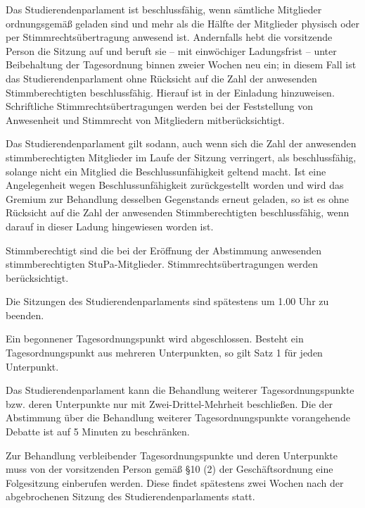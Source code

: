 \documentclass[10pt,a4paper]{scrartcl}
\begin{document}
\begin{contract}
  Das Studierendenparlament ist beschlussfähig, wenn sämtliche Mitglieder
  ordnungsgemäß geladen sind und mehr als die Hälfte der Mitglieder
  physisch oder per Stimmrechtsübertragung anwesend ist. Andernfalls
  hebt die vorsitzende Person die Sitzung auf und beruft sie -- mit
  einwöchiger Ladungsfrist -- unter Beibehaltung der Tagesordnung binnen
  zweier Wochen neu ein; in diesem Fall ist das Studierendenparlament
  ohne Rücksicht auf die Zahl der anwesenden Stimmberechtigten
  beschlussfähig. Hierauf ist in der Einladung hinzuweisen. Schriftliche
  Stimmrechtsübertragungen werden bei der Feststellung von Anwesenheit
  und Stimmrecht von Mitgliedern mitberücksichtigt.

  Das Studierendenparlament gilt sodann, auch wenn sich die Zahl der
  anwesenden stimmberechtigten Mitglieder im Laufe der Sitzung
  verringert, als beschlussfähig, solange nicht ein Mitglied die
  Beschlussunfähigkeit geltend macht. Ist eine Angelegenheit wegen
  Beschlussunfähigkeit zurückgestellt worden und wird das Gremium zur
  Behandlung desselben Gegenstands erneut geladen, so ist es ohne
  Rücksicht auf die Zahl der anwesenden Stimmberechtigten
  beschlussfähig, wenn darauf in dieser Ladung hingewiesen worden ist.

  Stimmberechtigt sind die bei der Eröffnung der Abstimmung anwesenden
  stimmberechtigten StuPa-Mitglieder. Stimmrechtsübertragungen werden
  berücksichtigt.



\label{dauer-der-sitzungen}




  Die Sitzungen des Studierendenparlaments sind spätestens um 1.00 Uhr
  zu beenden.

  Ein begonnener Tagesordnungspunkt wird abgeschlossen. Besteht ein
  Tagesordnungspunkt aus mehreren Unterpunkten, so gilt Satz 1 für jeden
  Unterpunkt.

  Das Studierendenparlament kann die Behandlung weiterer
  Tagesordnungspunkte bzw. deren Unterpunkte nur mit
  Zwei-Drittel-Mehrheit beschließen. Die der Abstimmung über die
  Behandlung weiterer Tagesordnungspunkte vorangehende Debatte ist auf 5
  Minuten zu beschränken.

  Zur Behandlung verbleibender Tagesordnungspunkte und deren Unterpunkte
	muss von der vorsitzenden Person gemäß §10 (2) der Geschäftsordnung eine
  Folgesitzung einberufen werden. Diese findet spätestens zwei Wochen
  nach der abgebrochenen Sitzung des Studierendenparlaments statt.


\end{contract}
\end{document}
